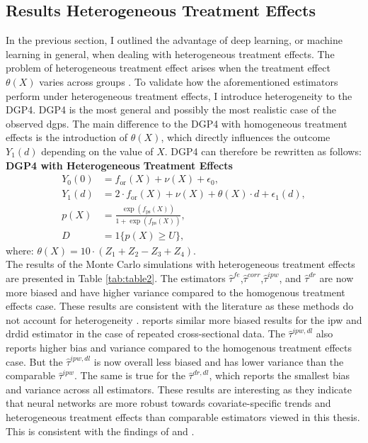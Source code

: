 \subsection{Results Heterogeneous Treatment Effects}
In the previous section, I outlined the advantage of deep learning, or machine learning in general, when dealing with heterogeneous treatment effects.
The problem of heterogeneous treatment effect arises when the treatment effect $\theta(X)$ varies across groups \citep{hansen2022econometrics}.
To validate how the aforementioned estimators perform under heterogeneous treatment effects, I introduce heterogeneity to the DGP4.
DGP4 is the most general and possibly the most realistic case of the observed \ac{dgp}s.
The main difference to the DGP4 with homogeneous treatment effects is the introduction of $\theta(X)$, which directly influences the outcome $Y_1(d)$ depending on the value of $X$.
DGP4 can therefore be rewritten as follows:
\\
\textbf{DGP4 with Heterogeneous Treatment Effects}
\begin{align*}
    Y_0(0) &= f_{\text{or}}(X) + \nu(X) + \epsilon_0, \\
    Y_1(d) &= 2 \cdot f_{\text{or}}(X) + \nu(X) + \theta(X) \cdot d + \epsilon_1(d), \\
    p(X) &= \frac{\exp \left( f_{\text{ps}}(X) \right)}{1 + \exp \left( f_{\text{ps}}(X) \right)}, \\
    D &= 1\{ p(X) \geq U \},
\end{align*}
where: $\theta(X) = 10 \cdot (Z_1 + Z_2 - Z_3 + Z_4)$.\\

The results of the Monte Carlo simulations with heterogeneous treatment effects are presented in Table \ref{tab:table2}.
The estimators $\hat{\tau}^{fe}$,$\hat{\tau}^{corr}$,$\hat{\tau}^{ipw}$, and $\hat{\tau}^{dr}$ are now more biased and have higher variance compared to the homogenous treatment effects case.
These results are consistent with the literature as these methods do not account for heterogeneity \citep{hansen2022econometrics}.
\citet{manfeDifferenceInDifferenceDesignRepeated} reports similar more biased results for the \ac{ipw} and \ac{drdid} estimator in the case of repeated cross-sectional data.
The $\hat{\tau}^{ipw,dl}$ also reports higher bias and variance compared to the homogenous treatment effects case.
But the $\hat{\tau}^{ipw,dl}$ is now overall less biased and has lower variance than the comparable $\hat{\tau}^{ipw}$.
The same is true for the $\hat{\tau}^{dr,dl}$, which reports the smallest bias and variance across all estimators.
These results are interesting as they indicate that neural networks are more robust towards covariate-specific trends and heterogeneous treatment effects than comparable estimators viewed in this thesis.
This is consistent with the findings of \citet{farrellDeepNeuralNetworks2021} and \citet{chernozhukovDoubleDebiasedMachine2018}.

